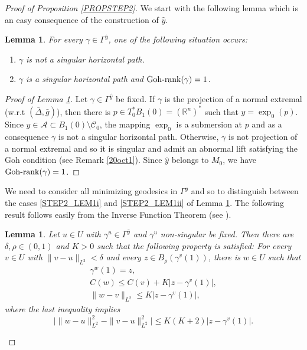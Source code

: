 \documentclass[JEP,XML,SOM,Unicode,NoFloatCountersInSection,published]{cedram}
\newenvironment{enumeratei}
{\bgroup\def\theenumi{\roman{enumi}}\def\theenumii{\arabic{enumii}}\begin{enumerate}}
{\end{enumerate}\egroup}
\DeclareMathOperator{\Gohrank}{Goh\textup{-}rank}
\newcommand\R{\mathbb R}
\newtheorem{lemma}[theorem]{Lemma}
\theoremstyle{definition}
\begin{document}
\begin{proof}[Proof of Proposition \ref{PROPSTEP2}]
We start with the following lemma which is an easy consequence of the construction of $\hat{y}$.

\begin{lemma}\label{STEP2_LEM1}
For every $\gamma \in \Gamma^{\hat{y}}$, one of the following situation occurs:
\begin{enumeratei}
\item\label{STEP2_LEM1i}
$\gamma$ is not a singular horizontal path.
\item\label{STEP2_LEM1ii}
$\gamma$ is a singular horizontal path and $\Gohrank(\gamma)=1$.
\end{enumeratei}
\end{lemma}

\begin{proof}[Proof of Lemma \ref{STEP2_LEM1}]
Let $\gamma \in \Gamma^{\hat{y}}$ be fixed. If $\gamma$ is the projection of a normal extremal (w.r.t $(\bar{\Delta},\bar{g})$), then there is $p\in T_0^*B_1(0)=(\R^n)^*$ such that $y=\exp_0(p)$. Since $\hat{y}\in \mathcal{A}\subset B_1(0) \setminus \mathcal{C}_0$, the mapping $\exp_0$ is a submersion at $p$ and as a consequence $\gamma$ is not a singular horizontal path. Otherwise, $\gamma$ is not projection of a normal extremal and so it is singular and admit an abnormal lift satisfying the Goh condition (see Remark \ref{20oct1}). Since $\hat{y}$ belongs to $M_0$, we have $\Gohrank(\gamma)=1$.
\end{proof}

We need to consider all minimizing geodesics in $\Gamma^{\hat{y}}$ and so to distinguish between the cases \eqref{STEP2_LEM1i} and \eqref{STEP2_LEM1ii} of Lemma \ref{STEP2_LEM1}. The following result follows easily from the Inverse Function Theorem (see \eg \cite[Proof of Th.\,3.14, p.\,99]{riffordbook}).

\begin{lemma}\label{STEP2_LEM2}
Let $u \in U$ with $\gamma^u \in \Gamma^{\hat{y}}$ and $\gamma^u$ non-singular be fixed. Then there are $\delta, \rho \in (0,1)$ and $K>0$ such that the following property is satisfied: For every $v\in U$ with $\|v-u\|_{L^2} < \delta$ and every $z\in B_{\rho}(\gamma^v(1))$, there is $w \in U$ such that
\begin{gather}\label{STEP2_LEM2_1}
\gamma^w(1) =z,
\\
\label{STEP2_LEM2_2}
C(w) \leq C(v) + K |z-\gamma^v(1)|,
\\
\label{STEP2_LEM2_3}
\| w-v\|_{L^2} \leq K |z - \gamma^v(1)|,
\end{gather}
where the last inequality implies
\begin{equation}\label{STEP2_LEM2_4}
\bigl|\| w-u\|_{L^2}^2 - \| v-u\|_{L^2}^2\bigr| \leq K(K+2) | z-\gamma^v(1)|.
\end{equation}
\end{lemma}


\end{proof}
\end{document}
